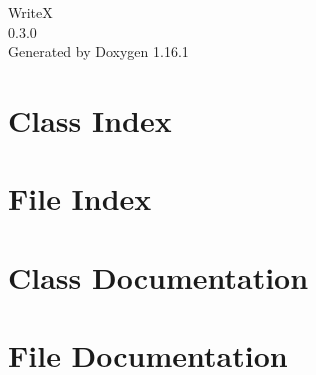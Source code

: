 \documentclass[twoside]{book}
\newcommand{\+}{\discretionary{\mbox{\scriptsize$\hookleftarrow$}}{}{}}
\newcommand{\clearemptydoublepage}{%
    \newpage{\pagestyle{empty}\cleardoublepage}%
  }
\begin{document}
  \raggedbottom
    \hypersetup{pageanchor=false,
                bookmarksnumbered=true,
                pdfencoding=unicode
               }
  \begin{titlepage}
  \vspace*{7cm}
  \begin{center}%
  {\Large WriteX}\\
  [1ex]\large 0.\+3.\+0 \\
  \vspace*{1cm}
  {\large Generated by Doxygen 1.16.1}\\
  \end{center}
  \end{titlepage}
  \clearemptydoublepage
  \tableofcontents
  \clearemptydoublepage
  \hypersetup{pageanchor=true}
\chapter{Class Index}

\chapter{File Index}

\chapter{Class Documentation}


\chapter{File Documentation}


  \backmatter
  \newpage
  \clearemptydoublepage
  \printindex
\end{document}

